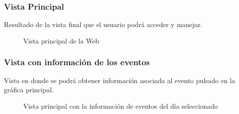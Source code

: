 \begin{minipage}{\linewidth}
\subsubsection{Vista Principal}
Resultado de la vista final que el usuario podrá acceder y manejar.
\begin{figure}[H]
\caption{Vista principal de la Web}
\end{figure}
\end{minipage}
\subsubsection{Vista con información de los eventos}
Vista en donde se podrá obtener información asociada al evento pulsado en la gráfica principal.

\begin{figure}[H]
\caption{Vista principal con la información de eventos del día seleccionado}
\end{figure}

